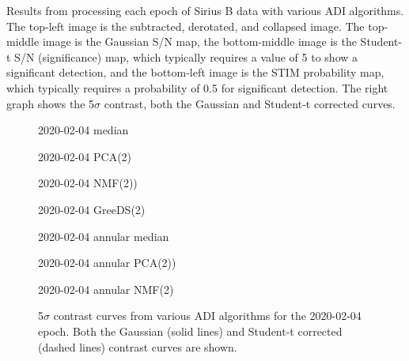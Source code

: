 Results from processing each epoch of Sirius B data with various ADI algorithms. The top-left image is the subtracted, derotated, and collapsed image. The top-middle image is the Gaussian S/N map, the bottom-middle image is the Student-t S/N (significance) map, which typically requires a value of 5 to show a significant detection, and the bottom-left image is the STIM probability map, which typically requires a probability of 0.5 for significant detection. The right graph shows the 5$\sigma$ contrast, both the Gaussian and Student-t corrected curves.    


\begin{figure}[h!]
    \centering
    \caption{2020-02-04 median}
\end{figure}

\begin{figure}[h!]
    \centering
    \caption{2020-02-04 PCA(2)}
\end{figure}

\begin{figure}[h!]
    \centering
    \caption{2020-02-04 NMF(2))}
\end{figure}

\begin{figure}[h!]
    \centering
    \caption{2020-02-04 GreeDS(2)}
\end{figure}

\begin{figure}[h!]
    \centering
    \caption{2020-02-04 annular median}
\end{figure}

\begin{figure}[h!]
    \centering
    \caption{2020-02-04 annular PCA(2))}
\end{figure}

\begin{figure}[h!]
    \centering
    \caption{2020-02-04 annular NMF(2)}
\end{figure}

\begin{figure}[h!]
    \centering
    \caption{5$\sigma$ contrast curves from various ADI algorithms for the 2020-02-04 epoch. Both the Gaussian (solid lines) and Student-t corrected (dashed lines) contrast curves are shown.}
\end{figure}

